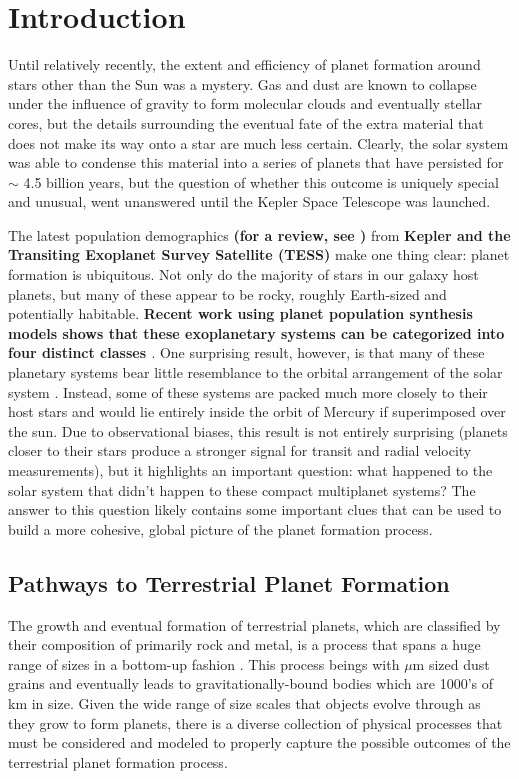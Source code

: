 \chapter {Introduction} \label{ch:intro}

Until relatively recently, the extent and efficiency of planet formation around stars other than the Sun was a mystery. Gas and dust are known to collapse under the influence of gravity to form molecular clouds and eventually stellar cores, but the details surrounding the eventual fate of the extra material that does not make its way onto a star are much less certain. Clearly, the solar system was able to condense this material into a series of planets that have persisted for $\sim$ 4.5 billion years, but the question of whether this outcome is uniquely special and unusual, went unanswered until the Kepler Space Telescope was launched.

The latest population demographics \textbf{(for a review, see \cite{winn15})} from \textbf{Kepler and the Transiting Exoplanet Survey Satellite (TESS)} make one thing clear: planet formation is ubiquitous. Not only do the majority of stars in our galaxy host planets, but many of these appear to be rocky, roughly Earth-sized and potentially habitable. \textbf{Recent work using planet population synthesis models shows that these exoplanetary systems can be categorized into four distinct classes \cite{emsenhuber23, mishra23a, mishra23b}}. One surprising result, however, is that many of these planetary systems bear little resemblance to the orbital arrangement of the solar system \textbf{\cite{raymond20}}. Instead, some of these systems are packed much more closely to their host stars and would lie entirely inside the orbit of Mercury if superimposed over the sun. Due to observational biases, this result is not entirely surprising (planets closer to their stars produce a stronger signal for transit and radial velocity measurements), but it highlights an important question: what happened to the solar system that didn't happen to these compact multiplanet systems? The answer to this question likely contains some important clues that can be used to build a more cohesive, global picture of the planet formation process.

\section{Pathways to Terrestrial Planet Formation}

The growth and eventual formation of terrestrial planets, which are classified by their composition of primarily rock and metal, is a process that spans a huge range of sizes in a bottom-up fashion \cite{safronov72}. This process beings with $\mu$m sized dust grains and eventually leads to gravitationally-bound bodies which are 1000's of km in size. Given the wide range of size scales that objects evolve through as they grow to form planets, there is a diverse collection of physical processes that must be considered and modeled to properly capture the possible outcomes of the terrestrial planet formation process.

